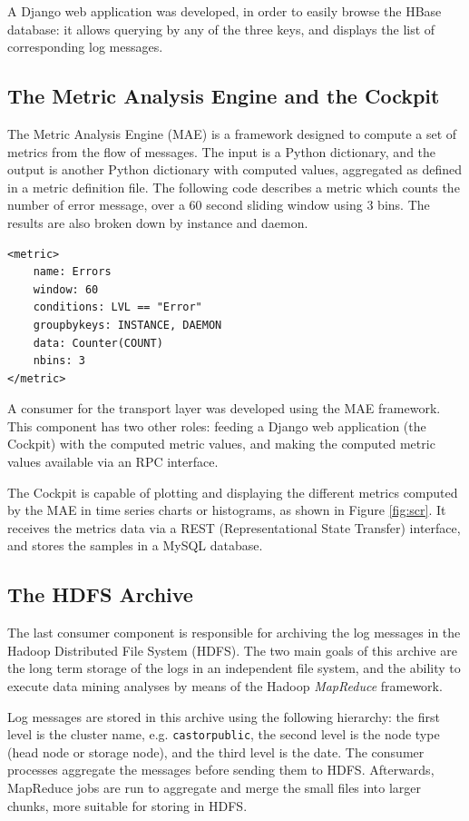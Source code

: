 A Django web application was developed, in order to easily browse the HBase database: it allows querying by any of the three keys, and displays the list of corresponding log messages.


\subsection{The Metric Analysis Engine and the Cockpit}

The Metric Analysis Engine (MAE) is a framework designed to compute a set of metrics from the flow of messages. The input is a Python dictionary, and the output is another Python dictionary with computed values, aggregated as defined in a metric definition file. The following code describes a metric which counts the number of error message, over a 60 second sliding window using 3 bins. The results are also broken down by instance and daemon.
\scriptsize
\begin{verbatim}
<metric>
    name: Errors
    window: 60
    conditions: LVL == "Error"
    groupbykeys: INSTANCE, DAEMON
    data: Counter(COUNT)
    nbins: 3
</metric>
\end{verbatim}
\normalsize

A consumer for the transport layer was developed using the MAE framework. This component has two other roles: feeding a Django web application (the Cockpit) with the computed metric values, and making the computed metric values available via an RPC interface.

The Cockpit is capable of plotting and displaying the different metrics computed by the MAE in time series charts or histograms, as shown in Figure \ref{fig:scr}. It receives the metrics data via a REST (Representational State Transfer) interface, and stores the samples in a MySQL database.


\subsection{The HDFS Archive}

The last consumer component is responsible for archiving the log messages in the Hadoop Distributed File System (HDFS). The two main goals of this archive are the long term storage of the logs in an independent file system, and the ability to execute data mining analyses by means of the Hadoop \textit{MapReduce} framework.

Log messages are stored in this archive using the following hierarchy: the first level is the cluster name, e.g. \texttt{castorpublic}, the second level is the node type (head node or storage node), and the third level is the date. The consumer processes aggregate the messages before sending them to HDFS. Afterwards, MapReduce jobs are run to aggregate and merge the small files into larger chunks, more suitable for storing in HDFS.

